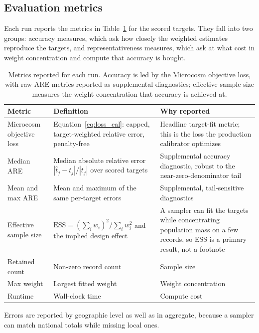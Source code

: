 \subsection{Evaluation metrics}
\label{sec:metrics}

Each run reports the metrics in Table~\ref{tab:metrics} for the scored targets. They fall into two
groups: accuracy measures, which ask how closely the weighted
estimates reproduce the targets, and representativeness measures, which ask at what cost in weight
concentration and compute that accuracy is bought.

\begin{table}[H]
\centering
{\tablefont
\begin{tabular}{p{}p{}p{}}
\toprule
Metric & Definition & Why reported \\
\midrule
Microcosm objective loss & Equation~\ref{eq:loss_cal}: capped, target-weighted relative error, penalty-free & Headline target-fit metric; this is the loss the production calibrator optimizes \\
Median ARE & Median absolute relative error $|\hat{t}_j - t_j| / |t_j|$ over scored targets & Supplemental accuracy diagnostic, robust to the near-zero-denominator tail \\
Mean and max ARE & Mean and maximum of the same per-target errors & Supplemental, tail-sensitive diagnostics \\
Effective sample size & $\mathrm{ESS} = (\sum_i w_i)^2 / \sum_i w_i^2$ and the implied design effect & A sampler can fit the targets while concentrating population mass on a few records, so ESS is a primary result, not a footnote \\
Retained count & Non-zero record count & Sample size \\
Max weight & Largest fitted weight & Weight concentration \\
Runtime & Wall-clock time & Compute cost \\
\bottomrule
\end{tabular}
}
\caption{Metrics reported for each run. Accuracy is led by the Microcosm objective loss, with raw ARE
metrics reported as supplemental diagnostics; effective sample size measures the weight concentration that
accuracy is achieved at.}
\label{tab:metrics}
\end{table}

Errors are reported by geographic level as well as in aggregate, because a sampler can match national
totals while missing local ones.

